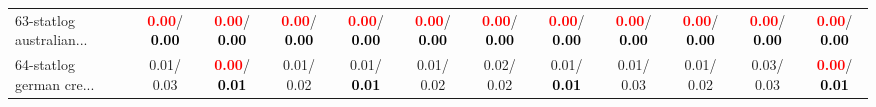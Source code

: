 \begin{table}[h]
\begin{center}
{\begin{tabular}{lc|c|c|c|c|c|c|c|c|c|c}
63-statlog australian... & \textcolor{red}{\textbf{  0.00}}/\textcolor{black}{\textbf{  0.00}} & \textcolor{red}{\textbf{  0.00}}/\textcolor{black}{\textbf{  0.00}} & \textcolor{red}{\textbf{  0.00}}/\textcolor{black}{\textbf{  0.00}} & \textcolor{red}{\textbf{  0.00}}/\textcolor{black}{\textbf{  0.00}} & \textcolor{red}{\textbf{  0.00}}/\textcolor{black}{\textbf{  0.00}} & \textcolor{red}{\textbf{  0.00}}/\textcolor{black}{\textbf{  0.00}} & \textcolor{red}{\textbf{  0.00}}/\textcolor{black}{\textbf{  0.00}} & \textcolor{red}{\textbf{  0.00}}/\textcolor{black}{\textbf{  0.00}} & \textcolor{red}{\textbf{  0.00}}/\textcolor{black}{\textbf{  0.00}} & \textcolor{red}{\textbf{  0.00}}/\textcolor{black}{\textbf{  0.00}} & \textcolor{red}{\textbf{  0.00}}/\textcolor{black}{\textbf{  0.00}} \\
64-statlog german cre... &   0.01/  0.03 & \textcolor{red}{\textbf{  0.00}}/\textcolor{black}{\textbf{  0.01}} &   0.01/  0.02 &   0.01/\textcolor{black}{\textbf{  0.01}} &   0.01/  0.02 &   0.02/  0.02 &   0.01/\textcolor{black}{\textbf{  0.01}} &   0.01/  0.03 &   0.01/  0.02 &   0.03/  0.03 & \textcolor{red}{\textbf{  0.00}}/\textcolor{black}{\textbf{  0.01}} \\\end{tabular}}\label{stratsALCKappa1aSVM}
\end{center}
\end{table}
